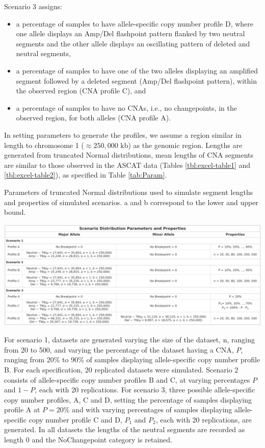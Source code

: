 Scenario 3 assigns:
\begin{itemize}
\item a percentage of samples to have allele-specific copy number profile D, where one allele displays an Amp/Del flashpoint pattern flanked by two neutral segments and the other allele displays an oscillating pattern of deleted and neutral segments,
\item a percentage of samples to have one of the two alleles displaying an amplified segment followed by a deleted segment (Amp/Del flashpoint pattern), within the observed region (CNA profile C), and 
\item a percentage of samples to have no CNAs, i.e., no changepoints, in the observed region, for both alleles (CNA profile A). 
\end{itemize}

In setting parameters to generate the profiles, we assume a region similar in length to chromosome 1 ($\approx 250,000$ kb) as the genomic region. Lengths are generated from truncated Normal distributions, mean lengths of CNA segments are similar to those observed in the ASCAT data (Tables \ref{tbl:excel-table1} and \ref{tbl:excel-table2}), as specified in Table \ref{tab:Param}.

\begin{table}[!htb]
\vspace{0.5cm}
\center
\caption[Parameters of truncated Normal distributions used to simulate segment lengths and properties of simulated scenarios.]{Parameters of truncated Normal distributions used to simulate segment lengths and properties of simulated scenarios. a and b correspond to the lower and upper bound.}
\includegraphics[width = 1\textwidth]{../tables/Chapter_5/TN_Distribution.png}
\label{tab:Param}
\end{table}

For scenario 1, datasets are generated varying the size of the dataset, n, ranging from 20 to 500, and varying the percentage of the dataset having a CNA, $P$, ranging from 20\% to 90\% of samples displaying allele-specific copy number profile B. For each specification, 20 replicated datasets were simulated. Scenario 2 consists of allele-specific copy number profiles B and C, at varying percentages $P$ and $1-P$, each with 20 replications. For scenario 3, three possible allele-specific copy number profiles, A, C and D, setting the percentage of samples displaying profile A at $P = 20\%$ and with varying percentages of samples displaying allele-specific copy number profile C and D, $P_1$ and $P_2$, each with 20 replications, are generated. In all datasets the lengths of the neutral segments are recorded as length 0 and the NoChangepoint category is retained. 

